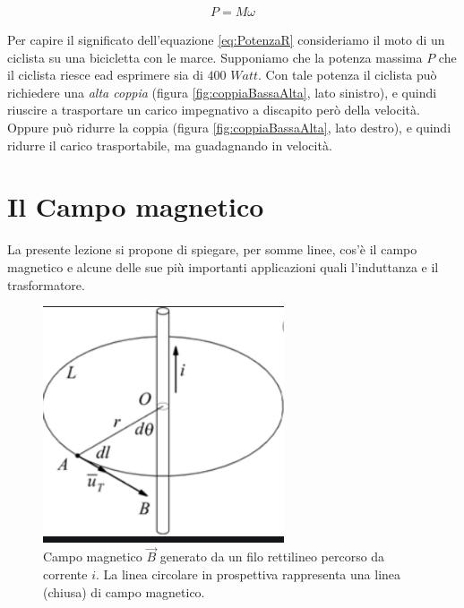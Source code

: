 \documentclass[17pt]{extarticle}
\begin{document}
\begin{eqnarray}\label{eq:PotenzaR}
	P = M\omega
\end{eqnarray} 


Per capire il significato dell'equazione \ref{eq:PotenzaR} consideriamo il moto di un ciclista su una bicicletta con le marce. Supponiamo che la potenza massima $P$ che il ciclista riesce ead esprimere sia di $400$ $Watt$. Con tale potenza il ciclista può richiedere una \emph{alta coppia} (figura \ref{fig:coppiaBassaAlta}, lato sinistro), e quindi riuscire a trasportare un carico impegnativo a discapito però della velocità. Oppure può ridurre la coppia (figura \ref{fig:coppiaBassaAlta}, lato destro), e quindi ridurre il carico trasportabile, ma guadagnando in velocità.


\clearpage








\section{Il Campo magnetico}


La presente lezione si propone di spiegare, per somme linee, cos'è il campo magnetico e alcune delle sue più importanti applicazioni quali l'induttanza e il trasformatore. 


\begin{figure}[b!]		
	\centering
   	\includegraphics[width=2.8in]{FiloRettilineoCorrente_B.jpg}		%
  	\caption{Campo magnetico $\vec{B}$ generato da un filo rettilineo percorso da corrente $i$. La linea circolare in prospettiva rappresenta una linea (chiusa) di campo magnetico.}
   	\label{fig:FiloRettilineoCorrente_B}
\end{figure}
\end{document}
